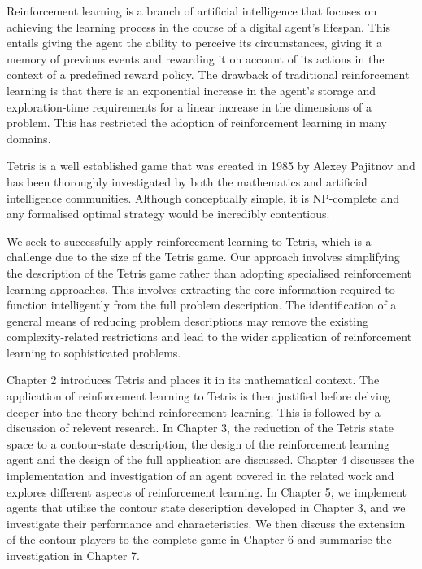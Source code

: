 \documentclass{rucsthesis}
\begin{document}
Reinforcement learning is a branch of artificial intelligence that focuses on achieving the learning process in the course of a digital agent's lifespan. This entails giving the agent the ability to perceive its circumstances, giving it a memory of previous events and rewarding it on account of its actions in the context of a predefined reward policy. The drawback of traditional reinforcement learning is that there is an exponential increase in the agent's storage and exploration-time requirements for a linear increase in the dimensions of a problem. This has restricted the adoption of reinforcement learning in many domains.

Tetris is a well established game that was created in 1985 by Alexey Pajitnov and has been thoroughly investigated by both the mathematics and artificial intelligence communities. Although conceptually simple, it is NP-complete \citep{hardtet} and any formalised optimal strategy would be incredibly contentious. 

We seek to successfully apply reinforcement learning to Tetris, which is a challenge due to the size of the Tetris game. Our approach involves simplifying the description of the Tetris game rather than adopting specialised reinforcement learning approaches. This involves extracting the core information required to function intelligently from the full problem description. The identification of a general means of reducing problem descriptions may remove the existing complexity-related restrictions and lead to the wider application of reinforcement learning to sophisticated problems. 

Chapter 2 introduces Tetris and places it in its mathematical context. The application of reinforcement learning to Tetris is then justified before delving deeper into the theory behind reinforcement learning. This is followed by a discussion of relevent research. In Chapter 3, the reduction of the Tetris state space to a contour-state description, the design of the reinforcement learning agent and the design of the full application are discussed. Chapter 4 discusses the implementation and investigation of an agent covered in the related work and explores different aspects of reinforcement learning.  In Chapter 5, we implement agents that utilise the contour state description developed in Chapter 3, and we investigate their performance and characteristics. We then discuss the extension of the contour players to the complete game in Chapter 6 and summarise the investigation in Chapter 7.
\end{document}
